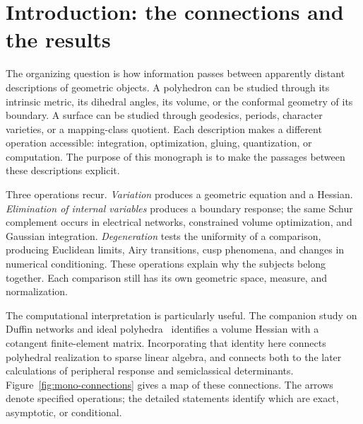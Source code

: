 \documentclass[11pt,a4paper]{article}
\numberwithin{equation}{section}
\theoremstyle{definition}
\theoremstyle{remark}
\begin{document}
\clearpage
\setcounter{tocdepth}{2}
\begingroup\small
\linespread{0.98}\selectfont
\setlength{\parskip}{0pt}
\tableofcontents
\endgroup
\clearpage
\begingroup\small
\setlength{\parskip}{0pt}
\listoffigures
\endgroup
\clearpage
\section*{Introduction: the connections and the results}
\label{sec:monographintro}

The organizing question is how information passes between apparently
distant descriptions of geometric objects. A polyhedron can be studied
through its intrinsic metric, its dihedral angles, its volume, or the
conformal geometry of its boundary. A surface can be studied through
geodesics, periods, character varieties, or a mapping-class quotient.
Each description makes a different operation accessible: integration,
optimization, gluing, quantization, or computation. The purpose of this
monograph is to make the passages between these descriptions explicit.

Three operations recur. \emph{Variation} produces a geometric equation
and a Hessian. \emph{Elimination of internal variables} produces a boundary
response; the same Schur complement occurs in electrical networks,
constrained volume optimization, and Gaussian integration.
\emph{Degeneration} tests the uniformity of a comparison, producing
Euclidean limits, Airy transitions, cusp phenomena, and changes in
numerical conditioning. These operations explain why the subjects
belong together. Each comparison still has its own geometric space,
measure, and normalization.

The computational interpretation is particularly useful. The companion
study on Duffin networks and ideal polyhedra~\cite{IpolyStudy} identifies
a volume Hessian with a cotangent finite-element matrix. Incorporating
that identity here connects polyhedral realization to sparse linear
algebra, and connects both to the later calculations of peripheral
response and semiclassical determinants. Figure~\ref{fig:mono-connections}
gives a map of these connections. The arrows denote specified operations;
the detailed statements identify which are exact, asymptotic, or conditional.
\end{document}
